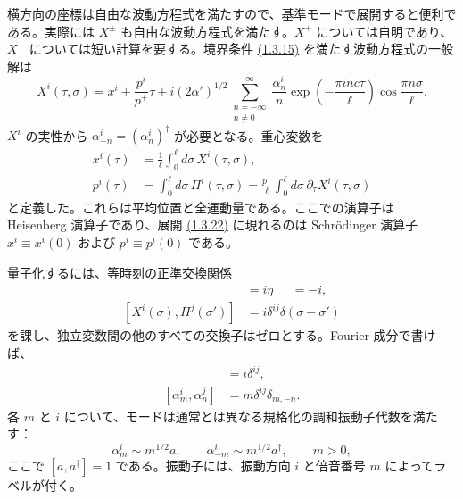 横方向の座標は自由な波動方程式を満たすので、基準モードで展開すると便利である。実際には $X^\pm$ も自由な波動方程式を満たす。$X^+$ については自明であり、$X^-$ については短い計算を要する。境界条件 \hyperref[eq:1.3.15]{(1.3.15)} を満たす波動方程式の一般解は
\begin{equation}
X^i(\tau,\sigma)=x^i+\frac{p^i}{p^+}\tau
+i(2\alpha')^{1/2}
\sum_{\substack{n=-\infty\\n\ne0}}^\infty
\frac{\alpha_n^i}{n}\exp\left(-\frac{\pi inc\tau}{\ell}\right)
\cos\frac{\pi n\sigma}{\ell}.
\tag{1.3.22}\label{eq:1.3.22}
\end{equation}
$X^i$ の実性から $\alpha_{-n}^i=(\alpha_n^i)^\dagger$ が必要となる。重心変数を
\begin{align}
x^i(\tau)&=\frac1\ell\int_0^\ell d\sigma\,X^i(\tau,\sigma),
\tag{1.3.23a}\label{eq:1.3.23a}\\
p^i(\tau)&=\int_0^\ell d\sigma\,\Pi^i(\tau,\sigma)
=\frac{p^+}{\ell}\int_0^\ell d\sigma\,\partial_\tau X^i(\tau,\sigma)
\tag{1.3.23b}\label{eq:1.3.23b}
\end{align}
と定義した。これらは平均位置と全運動量である。ここでの演算子は Heisenberg 演算子であり、展開 \hyperref[eq:1.3.22]{(1.3.22)} に現れるのは Schrödinger 演算子 $x^i\equiv x^i(0)$ および $p^i\equiv p^i(0)$ である。

量子化するには、等時刻の正準交換関係
\begin{align}
[x^-,p^+]&=i\eta^{-+}=-i,
\tag{1.3.24a}\label{eq:1.3.24a}\\
[X^i(\sigma),\Pi^j(\sigma')]&=i\delta^{ij}\delta(\sigma-\sigma')
\tag{1.3.24b}\label{eq:1.3.24b}
\end{align}
を課し、独立変数間の他のすべての交換子はゼロとする。Fourier 成分で書けば、
\begin{align}
[x^i,p^j]&=i\delta^{ij},
\tag{1.3.25a}\label{eq:1.3.25a}\\
[\alpha_m^i,\alpha_n^j]&=m\delta^{ij}\delta_{m,-n}.
\tag{1.3.25b}\label{eq:1.3.25b}
\end{align}
各 $m$ と $i$ について、モードは通常とは異なる規格化の調和振動子代数を満たす：
\begin{equation}
\alpha_m^i\sim m^{1/2}a,\qquad
\alpha_{-m}^i\sim m^{1/2}a^\dagger,\qquad m>0,
\tag{1.3.26}\label{eq:1.3.26}
\end{equation}
ここで $[a,a^\dagger]=1$ である。振動子には、振動方向 $i$ と倍音番号 $m$ によってラベルが付く。

